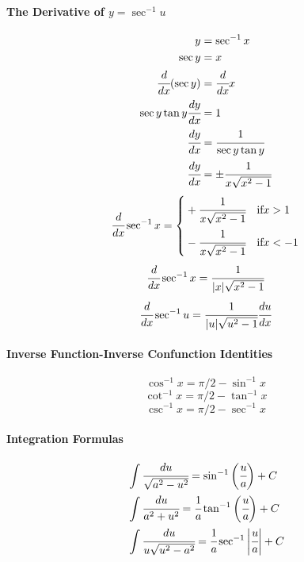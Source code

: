 \documentclass{article}
\begin{document}
            \paragraph{The Derivative of $y=\sec^{-1}u$}
            \begin{equation}
                \begin{aligned}
                    y&=\sec ^{-1}x\\
                    \sec y&=x\\
                    \cfrac{d}{dx}(\sec y)&=\cfrac{d}{dx}x\\
                    \sec y\tan y\cfrac{dy}{dx}&=1\\
                    \cfrac{dy}{dx}&=\cfrac{1}{\sec y\tan y}\\
                    \cfrac{dy}{dx}&=\pm \cfrac{1}{x\sqrt{x^2-1}}\\
                \end{aligned}
            \end{equation}
            \[\cfrac{d}{dx}\sec ^{-1} x=\left\{
                \begin{aligned}
                    &+\cfrac{1}{x\sqrt{x^2-1}}\quad\text{if}x>1\\
                    &-\cfrac{1}{x\sqrt{x^2-1}}\quad\text{if}x<-1\\
                \end{aligned}
            \right.\]
            \[\cfrac{d}{dx}\sec ^{-1} x=\cfrac{1}{|x|\sqrt{x^2-1}}\]
            \[\cfrac{d}{dx}\sec ^{-1} u=\cfrac{1}{|u|\sqrt{u^2-1}}\cfrac{du}{dx}\]
            \paragraph{Inverse Function-Inverse Confunction Identities}
            \[\cos ^{-1}x=\pi/2-\sin^{-1}x\]
            \[\cot ^{-1}x=\pi/2-\tan^{-1}x\]
            \[\csc ^{-1}x=\pi/2-\sec^{-1}x\]
            \paragraph{Integration Formulas}
            \begin{equation}
                \begin{aligned}
                    &\int\cfrac{du}{\sqrt{a^2-u^2}}=\sin ^{-1}\bigg(\cfrac{u}{a}\bigg)+C\\
                    &\int\cfrac{du}{a^2+u^2}=\cfrac{1}{a}\tan^{-1}\bigg(\cfrac{u}{a}\bigg)+C\\
                    &\int\cfrac{du}{u\sqrt{u^2-a^2}}=\cfrac{1}{a}\sec^{-1}\bigg|\cfrac{u}{a}\bigg|+C\\
                \end{aligned}
            \end{equation}
\end{document}
